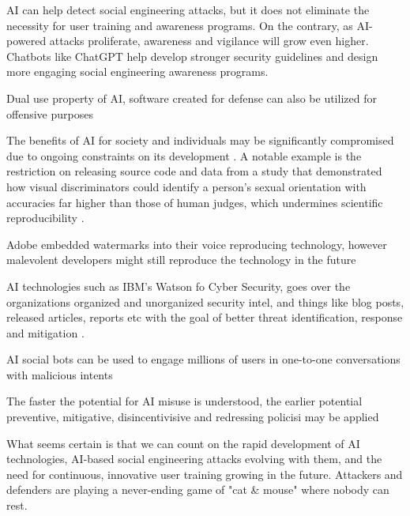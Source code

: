 AI can help detect social engineering attacks, but it does not eliminate the necessity for user training and awareness programs. On the contrary, as AI-powered attacks proliferate, awareness and vigilance will grow even higher. Chatbots like ChatGPT help develop stronger security guidelines and design more engaging social engineering awareness programs.

Dual use property of AI, software created for defense can also be utilized for offensive purposes \citep{blauth_AI_Crime_Overview_Malicious_Use_Abuse_2022}

The benefits of AI for society and individuals may be significantly compromised due to ongoing constraints on its development \citep{king_AI_Crime_Interdisciplinary_Analysis_2019}. A notable example is the restriction on releasing source code and data from a study that demonstrated how visual discriminators could identify a person's sexual orientation with accuracies far higher than those of human judges, which undermines scientific reproducibility \citep{king_AI_Crime_Interdisciplinary_Analysis_2019}.

Adobe embedded watermarks into their voice reproducing technology, however malevolent developers might still reproduce the technology in the future \citep{king_AI_Crime_Interdisciplinary_Analysis_2019}

AI technologies such as IBM's Watson fo Cyber Security, goes over the organizations organized and unorganized security intel, and things like blog posts, released articles, reports etc with the goal of better threat identification, response and mitigation \citep{king_AI_Crime_Interdisciplinary_Analysis_2019}.

AI social bots can be used to engage millions of users in one-to-one conversations with malicious intents \citep{king_AI_Crime_Interdisciplinary_Analysis_2019}

The faster the potential for AI misuse is understood, the earlier potential preventive, mitigative, disincentivisive and redressing policisi may be applied \citep{king_AI_Crime_Interdisciplinary_Analysis_2019}

What seems certain is that we can count on the rapid development of AI technologies, AI-based social engineering attacks evolving with them, and the need for continuous, innovative user training growing in the future. Attackers and defenders are playing a never-ending game of "cat \& mouse" where nobody can rest.